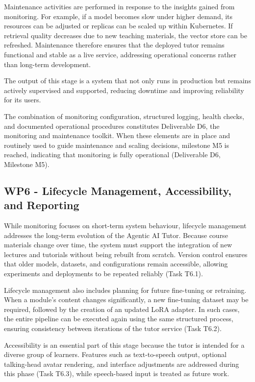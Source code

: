 Maintenance activities are performed in response to the insights gained from monitoring. For example, if a model becomes slow under higher demand, its resources can be adjusted or replicas can be scaled up within Kubernetes. If retrieval quality decreases due to new teaching materials, the vector store can be refreshed. Maintenance therefore ensures that the deployed tutor remains functional and stable as a live service, addressing operational concerns rather than long-term development.

The output of this stage is a system that not only runs in production but remains actively supervised and supported, reducing downtime and improving reliability for its users.

The combination of monitoring configuration, structured logging, health checks, and documented operational procedures constitutes Deliverable D6, the monitoring and maintenance toolkit. When these elements are in place and routinely used to guide maintenance and scaling decisions, milestone M5 is reached, indicating that monitoring is fully operational (Deliverable D6, Milestone M5).

\subsection{WP6 - Lifecycle Management, Accessibility, and Reporting}

While monitoring focuses on short-term system behaviour, lifecycle management addresses the long-term evolution of the Agentic AI Tutor. Because course materials change over time, the system must support the integration of new lectures and tutorials without being rebuilt from scratch. Version control ensures that older models, datasets, and configurations remain accessible, allowing experiments and deployments to be repeated reliably (Task T6.1).

Lifecycle management also includes planning for future fine-tuning or retraining. When a module's content changes significantly, a new fine-tuning dataset may be required, followed by the creation of an updated LoRA adapter. In such cases, the entire pipeline can be executed again using the same structured process, ensuring consistency between iterations of the tutor service (Task T6.2).

Accessibility is an essential part of this stage because the tutor is intended for a diverse group of learners. Features such as text-to-speech output, optional talking-head avatar rendering, and interface adjustments are addressed during this phase (Task T6.3), while speech-based input is treated as future work.


